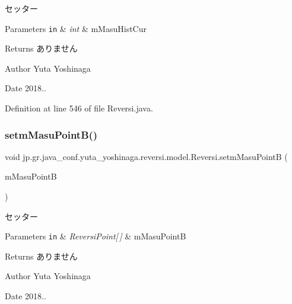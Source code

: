 セッター 


\begin{DoxyParams}[1]{Parameters}
\mbox{\tt in}  & {\em int} & m\+Masu\+Hist\+Cur \\
\hline
\end{DoxyParams}
\begin{DoxyReturn}{Returns}
ありません 
\end{DoxyReturn}
\begin{DoxyAuthor}{Author}
Yuta Yoshinaga 
\end{DoxyAuthor}
\begin{DoxyDate}{Date}
2018.. 
\end{DoxyDate}


Definition at line 546 of file Reversi.\+java.

\mbox{\label{classjp_1_1gr_1_1java__conf_1_1yuta__yoshinaga_1_1reversi_1_1model_1_1_reversi_a84a16cc376a04c1fad8ad47a637f5363}} 
\subsubsection{\texorpdfstring{setm\+Masu\+Point\+B()}{setmMasuPointB()}}
{\footnotesize\ttfamily void jp.\+gr.\+java\+\_\+conf.\+yuta\+\_\+yoshinaga.\+reversi.\+model.\+Reversi.\+setm\+Masu\+PointB (\begin{DoxyParamCaption}\item[{\hyperlink{classjp_1_1gr_1_1java__conf_1_1yuta__yoshinaga_1_1reversi_1_1model_1_1_reversi_point}{Reversi\+Point} \mbox{[}$\,$\mbox{]}}]{m\+Masu\+PointB }\end{DoxyParamCaption})}



セッター 


\begin{DoxyParams}[1]{Parameters}
\mbox{\tt in}  & {\em Reversi\+Point\mbox{[}$\,$\mbox{]}} & m\+Masu\+PointB \\
\hline
\end{DoxyParams}
\begin{DoxyReturn}{Returns}
ありません 
\end{DoxyReturn}
\begin{DoxyAuthor}{Author}
Yuta Yoshinaga 
\end{DoxyAuthor}
\begin{DoxyDate}{Date}
2018.. 
\end{DoxyDate}


